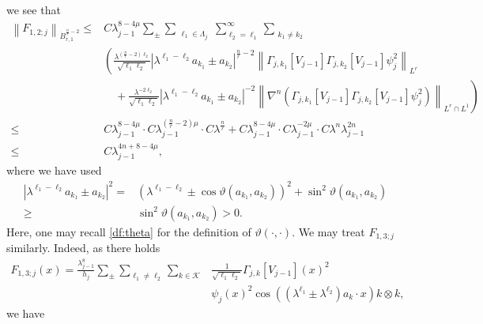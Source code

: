 \documentclass[a4paper,12pt,reqno]{amsart}
\theoremstyle{plain}
\theoremstyle{definition}
\newcommand{\dB}{\dot{B}}
\renewcommand{\leq}{\leqslant}
\renewcommand{\geq}{\geqslant}
\newcommand{\n}[1]{{\left\|#1\right\|}}
\renewcommand{\sp}[1]{\left(#1\right)}
\begin{document}
we see that 
\begin{align}
    \n{F_{1,2;j}}_{\dB_{r,1}^{\frac{n}{r}-2}}
    \leq
    {}&
    C
    \lambda_{j-1}^{8-4\mu}
    \sum_{\pm}
    \sum_{\substack{\ell_1 \in \Lambda_j}}
    \sum_{\ell_2=\ell_1}^{\infty}
    \sum_{\substack{k_1 \neq k_2}}
    \\
    &
    \left ( \frac{\lambda^{(\frac{n}{r}-2)\ell_2}}{\sqrt{\ell_1\ell_2}}
    |\lambda^{\ell_1-\ell_2}a_{k_1}\pm a_{k_2}|^{\frac{n}{r}-2}
    \n{\Gamma_{j,k_1}[V_{j-1}]
    \Gamma_{j,k_2}[V_{j-1}]
    \psi_{j}^2}_{L^r} \right. 
    \\
    & 
    \left. 
    \quad
    +
    \frac{\lambda^{-2\ell_2}}{\sqrt{\ell_1\ell_2}}
    |\lambda^{\ell_1-\ell_2}a_{k_1}\pm a_{k_2}|^{-2}
    \n{\nabla^n(\Gamma_{j,k_1}[V_{j-1}]
    \Gamma_{j,k_2}[V_{j-1}]
    \psi_{j}^2)}_{L^r\cap L^1} \right)
    \\
    \leq{}& 
    C
    \lambda_{j-1}^{8-4\mu}\cdot C\lambda_{j-1}^{(\frac{n}{r}-2)\mu}\cdot C\lambda^{\frac{n}{r}}
    +
    C\lambda_{j-1}^{8-4\mu}\cdot C\lambda_{j-1}^{-2\mu}\cdot C\lambda^n\lambda_{j-1}^{2n}
    \\
    \leq{}& 
    C\lambda_{j-1}^{4n+8-4\mu},
\end{align}
where we have used 
\begin{align}
    |\lambda^{\ell_1-\ell_2}a_{k_1}\pm a_{k_2}|^2
    ={}&
    \sp{\lambda^{\ell_1-\ell_2}\pm \cos \vartheta(a_{k_1},a_{k_2})}^2    
    +
    \sin^2\vartheta(a_{k_1},a_{k_2})
    \\
    \geq {}&
    \sin^2\vartheta(a_{k_1},a_{k_2})>0.
\end{align}
Here, one may recall \eqref{df:theta} for the definition of $\vartheta(\cdot,\cdot)$.
We may treat $F_{1,3;j}$ similarly.
Indeed, as there holds
\begin{align}
    F_{1,3;j}(x)
    =
    \frac{\lambda_{j-1}^{8}}{h_j}
    \sum_{\pm}
    \sum_{\ell_1 \neq \ell_2}
    \sum_{k \in \mathcal{K}}
    &
    \frac{1}{\sqrt{\ell_1\ell_2}}
    \Gamma_{j,k}[V_{j-1}](x)^2
    \\
    &
    \psi_{j}(x)^2
    \cos\sp{(\lambda^{\ell_1}\pm\lambda^{\ell_2})a_k\cdot x}
    k \otimes k,
\end{align}
we have
\end{document}
